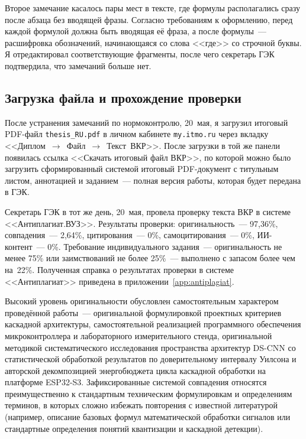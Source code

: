 Второе замечание касалось пары мест в тексте, где формулы
располагались сразу после абзаца без вводящей фразы. Согласно
требованиям к оформлению, перед каждой формулой должна быть
вводящая её фраза, а после формулы~--- расшифровка
обозначений, начинающаяся со слова <<где>> со строчной буквы.
Я отредактировал соответствующие фрагменты, после чего
секретарь ГЭК подтвердила, что замечаний больше нет.

\subsection{Загрузка файла и прохождение проверки}

После устранения замечаний по нормоконтролю, 20~мая, я
загрузил итоговый PDF-файл \texttt{thesis\_RU.pdf} в личном
кабинете \texttt{my.itmo.ru} через вкладку
<<Диплом~$\to$~Файл~$\to$~Текст~ВКР>>. После загрузки в той же
панели появилась ссылка <<Скачать итоговый файл ВКР>>, по
которой можно было загрузить сформированный системой
итоговый PDF-документ с титульным листом, аннотацией и
заданием~--- полная версия работы, которая будет передана в
ГЭК.

Секретарь ГЭК в тот же день, 20~мая, провела проверку текста
ВКР в системе <<Антиплагиат.ВУЗ>>. Результаты проверки:
оригинальность~--- 97,36\%, совпадения~--- 2,64\%,
цитирования~--- 0\%, самоцитирования~--- 0\%, ИИ-контент~---
0\%. Требование индивидуального задания~--- оригинальность не
менее 75\% или заимствований не более 25\%~--- выполнено с
запасом более чем на~22\%. Полученная справка
о результатах проверки в системе <<Антиплагиат>> приведена в
приложении~\ref{app:antiplagiat}.

Высокий уровень оригинальности обусловлен самостоятельным
характером проведённой работы~--- оригинальной формулировкой
проектных критериев каскадной архитектуры, самостоятельной
реализацией программного обеспечения микроконтроллера и
лабораторного измерительного стенда, оригинальной методикой
систематического исследования пространства архитектур
DS-CNN со статистической обработкой результатов по
доверительному интервалу Уилсона и авторской декомпозицией
энергобюджета цикла каскадной обработки на платформе ESP32-S3.
Зафиксированные системой совпадения относятся преимущественно
к стандартным техническим формулировкам и определениям
терминов, в которых сложно избежать повторения с известной
литературой (например, описание базовых формул математической
обработки сигналов или стандартные определения понятий
квантизации и каскадной детекции).

